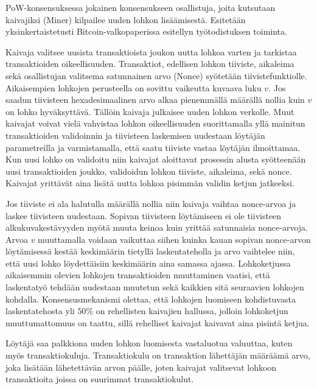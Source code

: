 PoW-konsensuksessa jokainen konsensukseen osallistuja, joita kutsutaan kaivajiksi (Miner) kilpailee uuden lohkon lisäämisestä. Esitetään yksinkertaistetusti Bitcoin-valkopaperissa \cite{Nakamoto_bitcoin} esitellyn työtodistuksen toiminta.

Kaivaja valitsee uusista transaktioista joukon uutta lohkoa varten ja tarkistaa transaktioiden oikeellisuuden. Transaktiot, edellisen lohkon tiiviste, aikaleima sekä osallistujan valitsema satunnainen arvo (Nonce) syötetään tiivistefunktiolle. Aikaisempien lohkojen perusteella on sovittu vaikeutta kuvaava luku $v$. Jos saadun tiivisteen hexadesimaalinen arvo alkaa pienemmällä määrällä nollia kuin $v$ on lohko hyväksyttävä. Tällöin kaivaja julkaisee uuden lohkon verkolle. Muut kaivajat voivat vielä vahvistaa lohkon oikeellisuuden suorittamalla yllä mainitun transaktioiden validoinnin ja tiivisteen laskemisen uudestaan löytäjän parametreilla ja varmistamalla, että saatu tiiviste vastaa löytäjän ilmoittamaa. Kun uusi lohko on validoitu niin kaivajat aloittavat prosessin alusta syötteenään uusi transaktioiden joukko, validoidun lohkon tiiviste, aikaleima, sekä nonce. Kaivajat yrittävät aina lisätä uutta lohkoa pisimmän validin ketjun jatkeeksi. 

Jos tiiviste ei ala halutulla määrällä nollia niin kaivaja vaihtaa nonce-arvoa ja laskee tiivisteen uudestaan. Sopivan tiivisteen löytämiseen ei ole tiivisteen alkukuvakestävyyden myötä muuta keinoa kuin yrittää satunnaisia nonce-arvoja. Arvoa $v$ muuttamalla voidaan vaikuttaa siihen kuinka kauan sopivan nonce-arvon löytämisessä kestää keskimäärin tietyllä laskentateholla ja arvo vaihtelee niin, että uusi lohko löydettäisiin keskimäärin aina samassa ajassa. Lohkoketjussa aikaisemmin olevien lohkojen transaktioiden muuttaminen vaatisi, että laskentatyö tehdään uudestaan muutetun sekä kaikkien sitä seuraavien lohkojen kohdalla. Konsensusmekanismi olettaa, että lohkojen luomiseen kohdistuvasta laskentatehosta yli $50\%$ on rehellisten kaivajien hallussa, jolloin lohkoketjun muuttumattomuus on taattu, sillä rehelliset kaivajat kaivavat aina pisintä ketjua.

Löytäjä saa palkkiona uuden lohkon luomisesta vastaluotua valuuttaa, kuten myös transaktiokuluja. Transaktiokulu on transaktion lähettäjän määräämä arvo, joka lisätään lähetettävän arvon päälle, joten kaivajat valitsevat lohkoon transaktioita joissa on suurimmat transaktiokulut.


